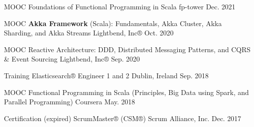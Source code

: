 
\begin{cvhonors}

  \cvhonor
    {MOOC}
    {Foundations of Functional Programming in Scala }
    {fp-tower}
    {Dec. 2021}

  \cvhonor
    {MOOC}
    {\textbf{Akka Framework} (Scala): Fundamentals, Akka Cluster, Akka Sharding, and Akka Streams}
    {Lightbend, Inc®}
    {Oct. 2020}

  \cvhonor
    {MOOC}
    {Reactive Architecture: DDD, Distributed Messaging Patterns, and CQRS \& Event Sourcing}
    {Lightbend, Inc®}
    {Sep. 2020}

  \cvhonor
    {Training}
    {Elasticsearch® Engineer 1 and 2}
    {Dublin, Ireland}
    {Sep. 2018}

  \cvhonor
    {MOOC}
    {Functional Programming in Scala (Principles, Big Data using Spark, and Parallel Programming)}
    {Coursera}
    {May. 2018}
  
  \cvhonor
    {Certification (expired)}
    {ScrumMaster® (CSM®)}
    {Scrum Alliance, Inc.}
    {Dec. 2017}

\end{cvhonors}